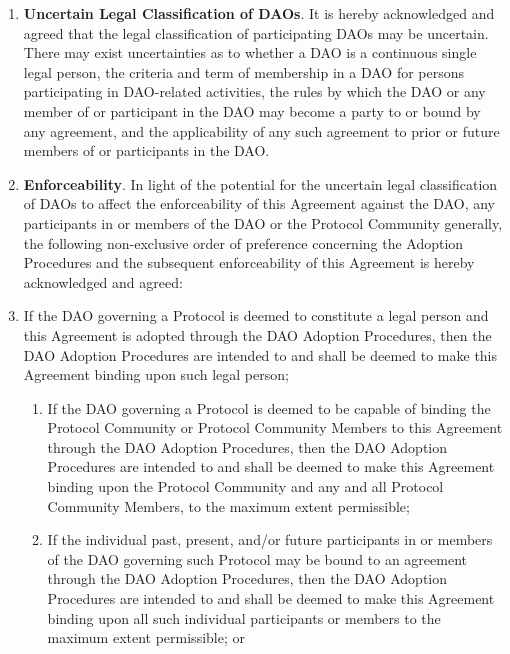 \documentclass{article}
\begin{document}
\begin{enumerate}[label=\Alph*.]
    \item \textbf{Uncertain Legal Classification of DAOs}. It is hereby acknowledged and agreed that the legal classification of participating DAOs may be uncertain. There may exist uncertainties as to whether a DAO is a continuous single legal person, the criteria and term of membership in a DAO for persons participating in DAO-related activities, the rules by which the DAO or any member of or participant in the DAO may become a party to or bound by any agreement, and the applicability of any such agreement to prior or future members of or participants in the DAO.

    \item \textbf{Enforceability}. In light of the potential for the uncertain legal classification of DAOs to affect the enforceability of this Agreement against the DAO, any participants in or members of the DAO or the Protocol Community generally, the following non-exclusive order of preference concerning the Adoption Procedures and the subsequent enforceability of this Agreement is hereby acknowledged and agreed:

    \item If the DAO governing a Protocol is deemed to constitute a legal person and this Agreement is adopted through the DAO Adoption Procedures, then the DAO Adoption Procedures are intended to and shall be deemed to make this Agreement binding upon such legal person;

          \begin{enumerate}

              \item If the DAO governing a Protocol is deemed to be capable of binding the Protocol Community or Protocol Community Members to this Agreement through the DAO Adoption Procedures, then the DAO Adoption Procedures are intended to and shall be deemed to make this Agreement binding upon the Protocol Community and any and all Protocol Community Members, to the maximum extent permissible;

              \item If the individual past, present, and/or future participants in or members of the DAO governing such Protocol may be bound to an agreement through the DAO Adoption Procedures, then the DAO Adoption Procedures are intended to and shall be deemed to make this Agreement binding upon all such individual participants or members to the maximum extent permissible; or


\end{enumerate}
\end{enumerate}
\end{document}
